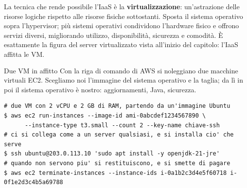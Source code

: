 \begin{center}
\end{center}

La tecnica che rende possibile l'IaaS è la \textbf{virtualizzazione}: un'astrazione delle risorse logiche rispetto alle
risorse fisiche sottostanti. Sposta il sistema operativo sopra l'hypervisor; più sistemi operativi condividono
l'hardware fisico e offrono servizi diversi, migliorando utilizzo, disponibilità, sicurezza e comodità. È esattamente la
figura del server virtualizzato vista all'inizio del capitolo: l'IaaS affitta le VM.

\begin{esempio}{Due VM in affitto}
Con la riga di comando di AWS si noleggiano due macchine virtuali EC2. Scegliamo noi l'immagine del sistema operativo e
la taglia; da lì in poi il sistema operativo è nostro: aggiornamenti, Java, sicurezza.
\begin{lstlisting}[style=shell, name=Terminale]
# due VM con 2 vCPU e 2 GB di RAM, partendo da un'immagine Ubuntu
$ aws ec2 run-instances --image-id ami-0abcdef1234567890 \
      --instance-type t3.small --count 2 --key-name chiave-ssh
# ci si collega come a un server qualsiasi, e si installa cio' che serve
$ ssh ubuntu@203.0.113.10 'sudo apt install -y openjdk-21-jre'
# quando non servono piu' si restituiscono, e si smette di pagare
$ aws ec2 terminate-instances --instance-ids i-0a1b2c3d4e5f60718 i-0f1e2d3c4b5a69788
\end{lstlisting}
\end{esempio}

